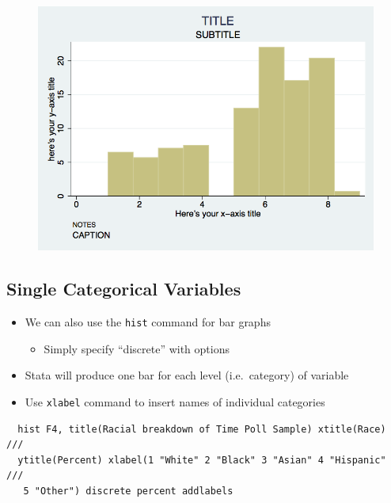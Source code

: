 \documentclass[]{book}
\providecommand{\tightlist}{%
  \setlength{\itemsep}{0pt}\setlength{\parskip}{0pt}}
\begin{document}
\begin{figure}
\centering
\includegraphics{Stata/StataModGraph/images/hist2.png}
\caption{}
\end{figure}

\subsection{Single Categorical
Variables}\label{single-categorical-variables}

\begin{itemize}
\tightlist
\item
  We can also use the \texttt{hist} command for bar graphs

  \begin{itemize}
  \tightlist
  \item
    Simply specify ``discrete'' with options
  \end{itemize}
\item
  Stata will produce one bar for each level (i.e.~category) of variable
\item
  Use \texttt{xlabel} command to insert names of individual categories
\end{itemize}

\begin{verbatim}
  hist F4, title(Racial breakdown of Time Poll Sample) xtitle(Race) ///
  ytitle(Percent) xlabel(1 "White" 2 "Black" 3 "Asian" 4 "Hispanic" ///
   5 "Other") discrete percent addlabels
\end{verbatim}
\end{document}
